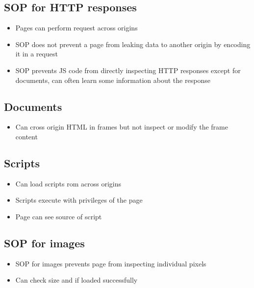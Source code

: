 \documentclass[12pt,a4paper]{article}
\begin{document}
\subsection{SOP for HTTP responses}
\begin{itemize}
    \item Pages can perform request across origins
    \item SOP does not prevent a page from leaking data to another origin by encoding it in a request
    \item SOP prevents JS code from directly inspecting HTTP responses except for documents, can often learn some information about the response
\end{itemize}

\subsection{Documents}
\begin{itemize}
    \item Can cross origin HTML in frames but not inspect or modify the frame content
\end{itemize}

\subsection{Scripts}
\begin{itemize}
    \item Can load scripts rom across origins
    \item Scripts execute with privileges of the page
    \item Page can see source of script
\end{itemize}

\subsection{SOP for images}
\begin{itemize}
    \item SOP for images prevents page from inspecting individual pixels
    \item Can check size and if loaded successfully
\end{itemize}
\end{document}
